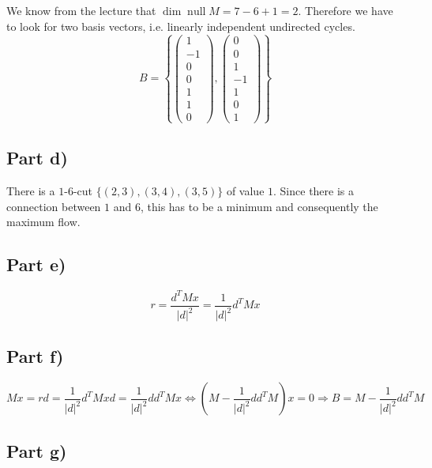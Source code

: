 \documentclass[10pt,a4paper]{article}
\DeclareMathOperator{\Null}{null}
\begin{document}
We know from the lecture that $\dim \Null M = 7 - 6 + 1 = 2$.
Therefore we have to look for two basis vectors, i.e. linearly independent undirected cycles.
\begin{equation*}
  B = \left\{
    \begin{pmatrix}
      1\\-1\\0\\0\\1\\1\\0
    \end{pmatrix},
    \begin{pmatrix}
      0\\0\\1\\-1\\1\\0\\1
    \end{pmatrix}
  \right\}
\end{equation*}

\subsection*{Part d)}

There is a $1$-$6$-cut $\{ (2, 3), (3, 4), (3, 5) \}$ of value $1$.
Since there is a connection between $1$ and $6$, this has to be a minimum and consequently the maximum flow.

\subsection*{Part e)}

\begin{equation*}
  r = \frac{d^{T}Mx}{|d|^{2}} = \frac{1}{|d|^{2}}d^{T}Mx
\end{equation*}

\subsection*{Part f)}

\begin{equation*}
  Mx = rd = \frac{1}{|d|^{2}}d^{T}Mxd = \frac{1}{|d|^{2}}dd^{T}Mx \Leftrightarrow \left( M - \frac{1}{|d|^{2}}dd^{T}M \right)x = 0 \Rightarrow B = M - \frac{1}{|d|^{2}}dd^{T}M
\end{equation*}

\subsection*{Part g)}
\end{document}
